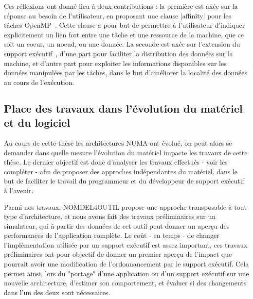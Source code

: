 Ces réflexions ont donné lieu à deux contributions : la première est axée sur la réponse au besoin de l'utilisateur, en proposant une clause |affinity| pour les tâches OpenMP~\cite{Virouleau2016b}.
Cette clause a pour but de permettre à l'utilisateur d'indiquer explicitement un lien fort entre une tâche et une ressource de la machine, que ce soit un coeur, un noeud, ou une donnée.
La seconde est axée sur l'extension du support exécutif~\cite{Virouleau2016a}, d'une part pour faciliter la distribution des données sur la machine, et d'autre part pour exploiter les informations disponibles sur les données manipulées par les tâches, dans le but d'améliorer la localité des données au cours de l'exécution.


\subsection*{Place des travaux dans l'évolution du matériel et du logiciel}

Au cours de cette thèse les architectures NUMA ont évolué, on peut alors se demander dans quelle mesure l'évolution du matériel impacte les travaux de cette thèse.
Le dernier objectif est donc d'analyser les travaux effectués - voir les compléter - afin de proposer des approches indépendantes du matériel, dans le but de faciliter le travail du programmeur et du développeur de support exécutif à l'avenir.

Parmi nos travaux, NOMDEL4OUTIL propose une approche transposable à tout type d'architecture, et nous avons fait des travaux préliminaires sur un simulateur, qui à partir des données de cet outil peut donner un aperçu des performances de l'application complète.
Le coût - en temps - de changer l'implémentation utilisée par un support exécutif est assez important, ces travaux préliminaires ont pour objectif de donner un premier aperçu de l'impact que pourrait avoir une modification de l'ordonnancement par le support exécutif.
Cela permet ainsi, lors du "portage" d'une application ou d'un support exécutif sur une nouvelle architecture, d'estimer son comportement, et évaluer si des changements dans l'un des deux sont nécessaires.
